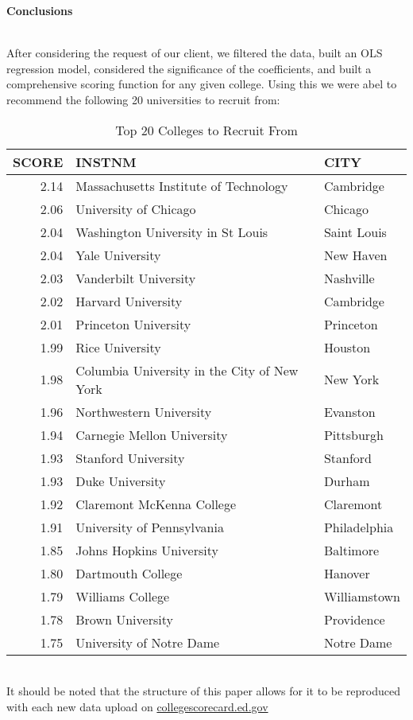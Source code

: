 

{\large\textbf{Conclusions}} \\\

After considering the request of our client, we filtered the data, built an OLS regression model, considered the significance of the coefficients, and built a comprehensive scoring function for any given college. Using this we were abel to recommend the following 20 universities to recruit from:
\begin{table}[ht]
\centering
\begin{tabular}{rll}
  \hline
SCORE & INSTNM & CITY \\ 
  \hline
2.14 & Massachusetts Institute of Technology & Cambridge \\ 
  2.06 & University of Chicago & Chicago \\ 
  2.04 & Washington University in St Louis & Saint Louis \\ 
  2.04 & Yale University & New Haven \\ 
  2.03 & Vanderbilt University & Nashville \\ 
  2.02 & Harvard University & Cambridge \\ 
  2.01 & Princeton University & Princeton \\ 
  1.99 & Rice University & Houston \\ 
  1.98 & Columbia University in the City of New York & New York \\ 
  1.96 & Northwestern University & Evanston \\ 
  1.94 & Carnegie Mellon University & Pittsburgh \\ 
  1.93 & Stanford University & Stanford \\ 
  1.93 & Duke University & Durham \\ 
  1.92 & Claremont McKenna College & Claremont \\ 
  1.91 & University of Pennsylvania & Philadelphia \\ 
  1.85 & Johns Hopkins University & Baltimore \\ 
  1.80 & Dartmouth College & Hanover \\ 
  1.79 & Williams College & Williamstown \\ 
  1.78 & Brown University & Providence \\ 
  1.75 & University of Notre Dame & Notre Dame \\ 
   \hline
\end{tabular}
\caption{Top 20 Colleges to Recruit From} 
\end{table}\\
It should be noted that the structure of this paper allows for it to be reproduced with each new data upload on \href{https://collegescorecard.ed.gov/data}{collegescorecard.ed.gov}
